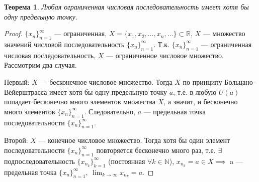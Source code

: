 \documentclass[a4paper,12pt]{article} %
\newtheorem{theorem}{Теорема}[section]
\theoremstyle{remark}
\theoremstyle{definition}
\begin{document}
\begin{theorem}
	Любая ограниченная числовая последовательность имеет хотя бы одну предельную точку.
\end{theorem}
\begin{proof}
	$\{x_n\}_{n=1}^{\infty}$ --- ограниченная, $X = \{x_1, x_2, \ldots, x_n, \ldots\} \subset \mathbb{R}$, $X$ --- множество значений числовой последовательность $\{x_n\}_{n=1}^{\infty}$. Т.к. $\{x_n\}_{n=1}^{\infty}$ --- ограниченная числовая последовательность, $X$ --- ограниченное числовое множество.
	Рассмотрим два случая.

	Первый: $X$ --- бесконечное числовое множество. Тогда $X$ по принципу Больцано-Вейерштрасса имеет хотя бы одну предельную точку $a$, т.е. в любую $U(a)$ попадает бесконечно много элементов множества $X$, а значит, и бесконечно много элементов $\{x_n\}_{n=1}^{\infty}$. Следовательно, $a$ --- предельная точка последовательности $\{x_n\}_{n=1}^{\infty}$.

	Второй: $X$ --- конечное числовое множество. Тогда хотя бы один элемент последовательности $\{x_n\}_{n=1}^{\infty}$ 
    повторяется бесконечно много раз, т.е. $\exists$ подпоследовательность $\{x_{n_k}\}_{k=1}^{\infty}$ 
    (постоянная $\forall k\in \mathbb{N}$), $x_{n_k} = a\in  X \implies$ 
    a --- предельная точка $\displaystyle \{x_n\}_{n=1}^{\infty}, \ \lim_{k \to \infty} x_{n_k} = a$.
\end{proof}
\end{document}
